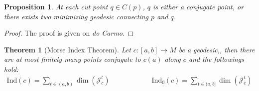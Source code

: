 \documentclass[11pt]{book}
\theoremstyle{break}
\theoremstyle{break}
\newtheorem{thm}{Theorem}[section]
\newtheorem{prop}[lem]{Proposition}
\begin{document}
\begin{prop}
At each cut point $q \in C(p)$, $q$ is either a conjugate point, or there exists two minimizing geodesic connecting $p$ and $q$. 
\end{prop}
\begin{proof}
The proof is given on \textit{do Carmo}.
\end{proof}

\newpage
\begin{thm}[Morse Index Theorem]
Let $c:[a,b] \to M$ be a geodesic,, then there are at most finitely many points conjugate to $c(a)$ along $c$ and the followings hold:
\begin{align*}
\text{Ind}(c) = \sum_{t \in (a,b)}\dim\left( \mathcal{J}_c^t\right)\qquad\qquad\qquad
\text{Ind}_0(c) = \sum_{t\in (a,b]}\dim\left( \mathcal{J}_c^t\right)
\end{align*}
\end{thm}
\end{document}
